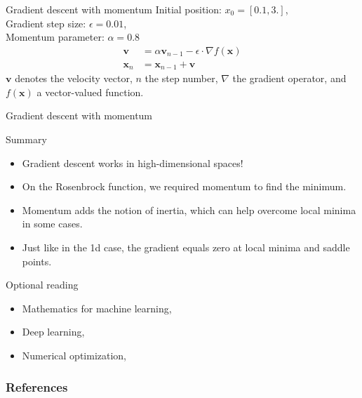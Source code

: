 \documentclass{beamer}
\begin{document}
    \begin{frame}{Gradient descent with momentum}
      Initial position: $x_0 = [0.1, 3.]$, \\
      Gradient step size: $\epsilon = 0.01 $, \\
      Momentum parameter: $\alpha = 0.8$
      \begin{align}
        \mathbf{v} &= \alpha \mathbf{v}_{n-1} - \epsilon \cdot \nabla f(\mathbf{x}) \\
        \mathbf{x}_n &= \mathbf{x}_{n-1} + \mathbf{v}
      \end{align}
      $\mathbf{v}$ denotes the velocity vector, 
      $n$ the step number, $\nabla$ the gradient operator, and $f(\mathbf{x})$ a vector-valued function.
    \end{frame}


    \begin{frame}{Gradient descent with momentum}
      \centering
    \end{frame}

    \begin{frame}{Summary}
      \begin{itemize}
        \item Gradient descent works in high-dimensional spaces!
        \item On the Rosenbrock function, we required momentum to find the minimum.
        \item Momentum adds the notion of inertia, which can help overcome local minima in some cases.
        \item Just like in the 1d case, the gradient equals zero at local minima and saddle points.
      \end{itemize}
    \end{frame}

    \begin{frame}{Optional reading}
      \begin{itemize}
        \item Mathematics for machine learning, \cite[Chapter 5, Vector Calculus]{deisenroth2020mathematics}
        \item Deep learning, \cite[Chapter 8.2, Automatic Differentiation]{wright1999numerical}
        \item Numerical optimization, \cite[Chapter 8, Optimization for Training Deep Models]{goodfellow2016deep}
      \end{itemize}
    \end{frame}

    \begin{frame}
      \frametitle{References}
      \renewcommand*{\bibfont}{\scriptsize}
      \printbibliography
  \end{frame}
\end{document}
